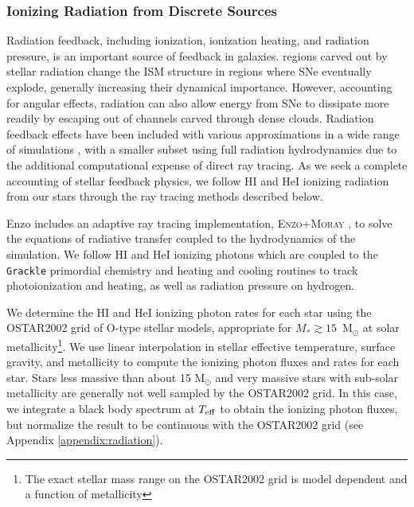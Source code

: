 \subsubsection{Ionizing Radiation from Discrete Sources}
\label{ch1:sec:ionizing radiation}
Radiation feedback, including ionization, ionization heating, and radiation pressure, is an important source of feedback in galaxies.  regions carved out by stellar radiation change the ISM structure in regions where SNe eventually explode, generally increasing their dynamical importance. However, accounting for angular effects, radiation can also allow energy from SNe to dissipate more readily by escaping out of channels carved through dense clouds. Radiation feedback effects have been included with various approximations in a wide range of simulations \citep[e.g.][]{OppenheimerDave2006, Krumholz2007, HQM2012, Agertz2013, Renaud2013, Stinson2013, Roskar2014, Ceverino2014, FIRE, AgertzKravtsov2015, Forbes2016, Hu2016, Hu2017, FIRE2}, with a smaller subset using full radiation hydrodynamics \citep{WiseAbel2012,Wise2012a,Wise2014,Kim2013a, Kim2013b,Pawlik2013,Rosdahl2015,Aubert2015,Ocvirk2016,BaczynskiGloverKlessen2015,Pawlik2017} due to the additional computational expense of direct ray tracing. As we seek a complete accounting of stellar feedback physics, we follow HI and HeI ionizing radiation from our stars through the ray tracing methods described below.

Enzo includes an adaptive ray tracing implementation, \textsc{Enzo+Moray} \citep{WiseAbel2011}, to solve the equations of radiative transfer coupled to the hydrodynamics of the simulation. We follow HI and HeI ionizing photons which are coupled to the \texttt{Grackle} primordial chemistry and heating and cooling routines to track photoionization and heating, as well as radiation pressure on hydrogen.

We determine the HI and HeI ionizing photon rates for each star using the OSTAR2002 \citep{Lanz2003} grid of O-type stellar models, appropriate for $M_{*} \gtrsim 15$~M$_{\odot}$ at solar metallicity\footnote{The exact stellar mass range on the OSTAR2002 grid is model dependent and a function of metallicity}. We use linear interpolation in stellar effective temperature, surface gravity, and metallicity to compute the ionizing photon fluxes and rates for each star. Stars less massive than about 15 M$_{\odot}$ and very massive stars with sub-solar metallicity are generally not well sampled by the OSTAR2002 grid. In this case, we integrate a black body spectrum at $T_{\rm eff}$ to obtain the ionizing photon fluxes, but normalize the result to be continuous with the OSTAR2002 grid (see Appendix \ref{appendix:radiation}).

